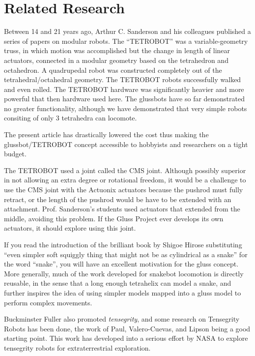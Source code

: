 \documentclass[11pt]{article}
\begin{document}
\section{Related Research}

Between 14 and 21 years ago, Arthur C. Sanderson and his colleagues published a series of
papers\cite{sanderson1996modular,lee2002dynamic,lee1999dynamics} on modular robots.
The ``TETROBOT'' was a variable-geometry truss, in which motion was accomplished but the change
in length of linear actuators, connected in a modular geometry based on the tetrahedron and octahedron.
A quadrupedal robot was constructed completely out of the tetrahedral/octahedral geometry.
The TETROBOT robots successfully walked and even rolled. The TETROBOT hardware was significantly
heavier and more powerful that then hardware used here. The glussbots have so far demonstrated no greater functionality,
although we have demonstrated that very simple robots consiting of only 3 tetrahedra can locomote.

The present article has drastically lowered the cost thus making the glussbot/TETROBOT concept
accessible to hobbyists and researchers on a tight budget.

The TETROBOT used a joint called the CMS joint. Although
possibly superior in not allowing an extra degree or rotational freedom, it would be a challenge to use the CMS
joint with the Actuonix actuators because the pushrod must fully retract, or the length of the pushrod would be
have to be extended with an attachment. Prof. Sanderson's students used actuators that
extended from the middle, avoiding this problem. If the Gluss Project ever develops its own actuators, it should
explore using this joint.

If you read the introduction of the brilliant book by Shigoe Hirose\cite{hirose1993biologically} substituting
``even simpler soft squiggly thing that might not be as cylindrical as a snake'' for the word ``snake'', you will have
an excellent motivation for the gluss concept.  More generally, much of the work developed for snakebot
locomotion\cite{liljebäck2012snake} is directly reusable, in the sense that a long enough tetrahelix can
model a snake, and further inspires the idea of using simpler models mapped into a gluss model to perform
complex movements.

Buckminster Fuller also promoted \emph{tensegrity}, and some research on Tensegrity Robots has been done, the
work of Paul, Valero-Cuevas, and Lipson\cite{paul2006} being a good starting point.
This work has developed into a serious effort by NASA to explore tensegrity robots for extraterrestrial
exploration.
\end{document}
